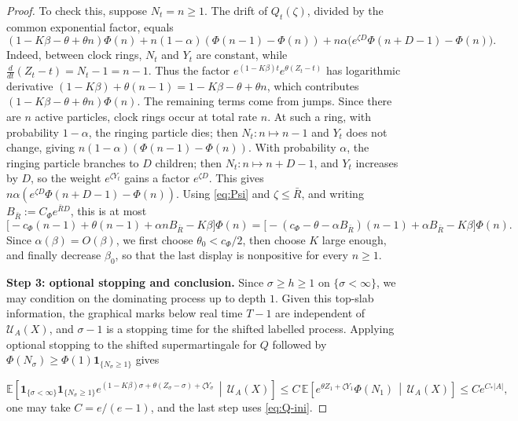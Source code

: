 \documentclass[letterpaper,11pt,reqno]{amsart}
\theoremstyle{definition}
\begin{document}
\begin{proof}
To check this, suppose \(N_t=n\ge1\). The drift of \(Q_t(\zeta)\), divided by
the common exponential factor, equals
\[
(1-K\beta-\theta+\theta n)\Phi(n)
+n(1-\alpha)(\Phi(n-1)-\Phi(n))
+n\alpha\bigl(e^{\zeta D}\Phi(n+D-1)-\Phi(n)\bigr).
\]
Indeed, between clock rings, \(N_t\) and \(Y_t\) are constant, while $\frac{d}{dt}(Z_t-t)=N_t-1=n-1$. Thus the factor \(e^{(1-K\beta)t}e^{\theta(Z_t-t)}\) has logarithmic derivative $(1-K\beta)+\theta(n-1)=1-K\beta-\theta+\theta n$, which contributes $(1-K\beta-\theta+\theta n)\Phi(n).$
%
The remaining terms come from jumps. Since there are \(n\) active particles, clock rings occur at total rate \(n\).
At such a ring, with probability \(1-\alpha\), the ringing particle dies; then \(N_t:n\mapsto n-1\) and \(Y_t\) does not change, giving $n(1-\alpha)(\Phi(n-1)-\Phi(n))$.
With probability \(\alpha\), the ringing particle branches to \(D\) children; then \(N_t:n\mapsto n+D-1\), and \(Y_t\) increases by \(D\), so the weight \(e^{\zeta Y_t}\) gains a factor \(e^{\zeta D}\). This gives $n\alpha(e^{\zeta D}\Phi(n+D-1)-\Phi(n))$.
Using \eqref{eq:Psi} and \(\zeta\le\bar R\), and writing
\(B_{\bar R}:=C_\Phi e^{\bar R D}\), this is at most
\[
        \bigl[-c_\Phi(n-1)+\theta(n-1)+\alpha n B_{\bar R}-K\beta\bigr]\Phi(n)
        =
        \bigl[-(c_\Phi-\theta-\alpha B_{\bar R})(n-1)
        +\alpha B_{\bar R}-K\beta\bigr]\Phi(n).
\]
Since \(\alpha(\beta)=O(\beta)\), we first choose
\(\theta_0<c_\Phi/2\), then choose \(K\) large enough, and finally decrease
\(\beta_0\), so that the last display is nonpositive for every \(n\ge1\).



\smallskip
\noindent\textbf{Step 3: optional stopping and conclusion.}
Since \(\sigma\ge h\geq 1\) on \(\{\sigma<\infty\}\), we may condition on the dominating process up to depth \(1\).  Given this top-slab information, the graphical marks below real time \(T-1\) are independent of \(\mathcal U_A(X)\), and \(\sigma-1\) is a stopping time for the shifted labelled process. Applying
optional stopping to the shifted supermartingale for $Q$ followed by \(\Phi(N_\sigma)\ge\Phi(1)\mathbf 1_{\{N_\sigma\ge1\}}\) gives





\begin{equation}\label{eq:OST}
\mathbb E\left[
        \mathbf 1_{\{\sigma<\infty\}}
        \mathbf 1_{\{N_\sigma\ge1\}}
        e^{(1-K\beta)\sigma+\theta(Z_\sigma-\sigma)+\zeta Y_\sigma}
        \,\middle|\,
        \mathcal U_A(X)
\right] \le
C\,
\mathbb E\left[
        e^{\theta Z_1+\zeta Y_1}\Phi(N_1)
        \,\middle|\,
        \mathcal U_A(X)
\right]
\le
C e^{C_*|A|},
\end{equation}
one may take $C=e/(e-1)$, and the last step uses \eqref{eq:Q-ini}.



\end{proof}
\end{document}
